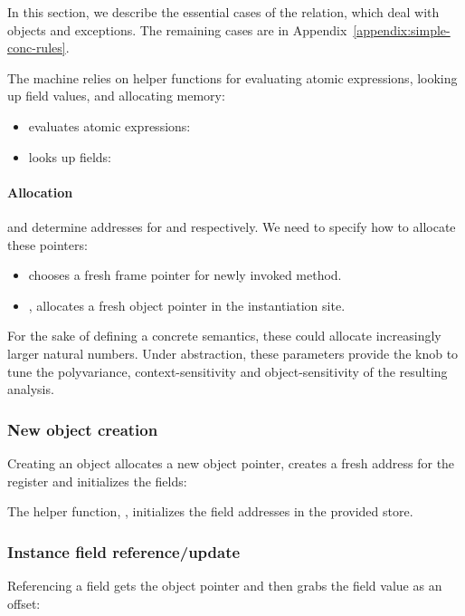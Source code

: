 In this section, we describe the essential cases of the 
relation, which deal with objects and exceptions.  The remaining cases
are in Appendix~\ref{appendix:simple-conc-rules}.

The machine relies on helper functions for evaluating atomic
expressions, looking up field values, and allocating memory:
 \begin{itemize}


  \item  evaluates atomic expressions:
  

\item
  looks up fields:
  



\end{itemize}

\paragraph{Allocation}
 and  
determine 
  addresses for  and 
  respectively.
We need to specify how to allocate these pointers:
\begin{itemize}

\item
   
  chooses a fresh frame pointer for newly invoked method. 

\item
,
 allocates a  fresh object pointer in the instantiation site.

\end{itemize}
For the sake of defining a concrete semantics,
these could allocate increasingly larger natural numbers.
Under abstraction, these parameters provide the knob to tune the
  polyvariance, context-sensitivity and object-sensitivity 
  of the resulting analysis.


\subsubsection{New object creation}

Creating an object allocates a new object pointer,
creates a fresh address for the register 
and initializes the fields:

The  helper function,     ,  
  initializes the field addresses in the provided store.

\subsubsection{Instance field reference/update}
Referencing a field gets the object pointer
and then grabs the field value as an offset:

